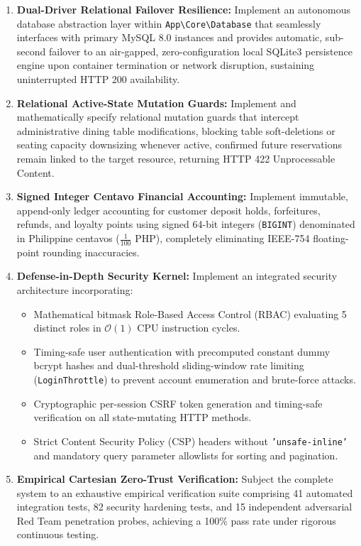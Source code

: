 \begin{enumerate}[label=\textbf{TO\arabic*.}]
    \item \textbf{Dual-Driver Relational Failover Resilience:} Implement an autonomous database abstraction layer within \texttt{App\textbackslash Core\textbackslash Database} that seamlessly interfaces with primary MySQL 8.0 instances and provides automatic, sub-second failover to an air-gapped, zero-configuration local SQLite3 persistence engine upon container termination or network disruption, sustaining uninterrupted HTTP 200 availability.
    \item \textbf{Relational Active-State Mutation Guards:} Implement and mathematically specify relational mutation guards that intercept administrative dining table modifications, blocking table soft-deletions or seating capacity downsizing whenever active, confirmed future reservations remain linked to the target resource, returning HTTP 422 Unprocessable Content.
    \item \textbf{Signed Integer Centavo Financial Accounting:} Implement immutable, append-only ledger accounting for customer deposit holds, forfeitures, refunds, and loyalty points using signed 64-bit integers (\texttt{BIGINT}) denominated in Philippine centavos ($\frac{1}{100}$ PHP), completely eliminating IEEE-754 floating-point rounding inaccuracies.
    \item \textbf{Defense-in-Depth Security Kernel:} Implement an integrated security architecture incorporating:
    \begin{itemize}
        \item Mathematical bitmask Role-Based Access Control (RBAC) evaluating 5 distinct roles in $\mathcal{O}(1)$ CPU instruction cycles.
        \item Timing-safe user authentication with precomputed constant dummy bcrypt hashes and dual-threshold sliding-window rate limiting (\texttt{LoginThrottle}) to prevent account enumeration and brute-force attacks.
        \item Cryptographic per-session CSRF token generation and timing-safe verification on all state-mutating HTTP methods.
        \item Strict Content Security Policy (CSP) headers without \texttt{'unsafe-inline'} and mandatory query parameter allowlists for sorting and pagination.
    \end{itemize}
    \item \textbf{Empirical Cartesian Zero-Trust Verification:} Subject the complete system to an exhaustive empirical verification suite comprising 41 automated integration tests, 82 security hardening tests, and 15 independent adversarial Red Team penetration probes, achieving a 100\% pass rate under rigorous continuous testing.
\end{enumerate}

